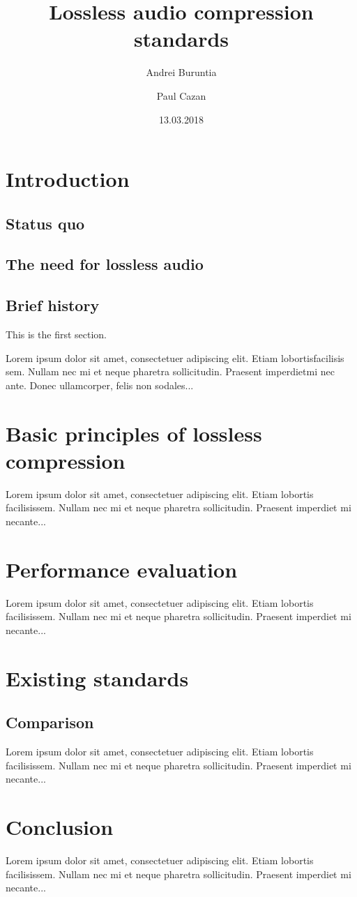 \documentclass{article}
\title{Lossless audio compression standards}
\author{Andrei Buruntia}
\author{Paul Cazan}
\date{13.03.2018 }
\begin{document}
 
\maketitle
 
\tableofcontents
 
\section{Introduction}
\subsection{Status quo}
\subsection{The need for lossless audio}
\subsection{Brief history}
 
This is the first section.
 
Lorem  ipsum  dolor  sit  amet,  consectetuer  adipiscing  
elit.   Etiam  lobortisfacilisis sem.  Nullam nec mi et 
neque pharetra sollicitudin.  Praesent imperdietmi nec ante. 
Donec ullamcorper, felis non sodales...
 
\section{ Basic principles of lossless compression}

Lorem ipsum dolor sit amet, consectetuer adipiscing elit.  
Etiam lobortis facilisissem.  Nullam nec mi et neque pharetra 
sollicitudin.  Praesent imperdiet mi necante...


\section{Performance evaluation}
 
Lorem ipsum dolor sit amet, consectetuer adipiscing elit.  
Etiam lobortis facilisissem.  Nullam nec mi et neque pharetra 
sollicitudin.  Praesent imperdiet mi necante...
 
\section{Existing standards}
 \subsection{Comparison}
Lorem ipsum dolor sit amet, consectetuer adipiscing elit.  
Etiam lobortis facilisissem.  Nullam nec mi et neque pharetra 
sollicitudin.  Praesent imperdiet mi necante...

 \section{Conclusion}
 
Lorem ipsum dolor sit amet, consectetuer adipiscing elit.  
Etiam lobortis facilisissem.  Nullam nec mi et neque pharetra 
sollicitudin.  Praesent imperdiet mi necante...
 
\end{document}
